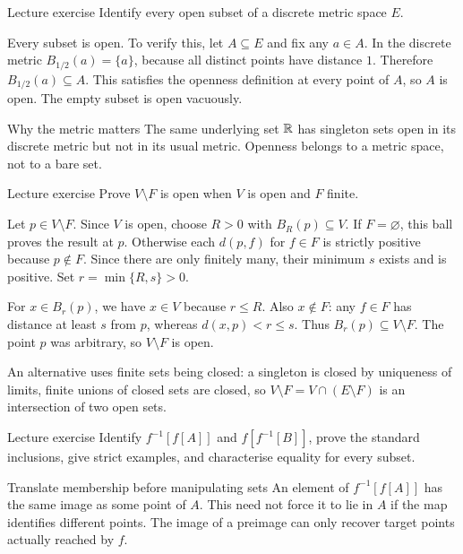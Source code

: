 \begin{exam}{Lecture exercise}
Identify every open subset of a discrete metric space $E$.
\end{exam}
\begin{answer}
Every subset is open. To verify this, let $A\subseteq E$ and fix any $a\in A$. In the discrete metric $B_{1/2}(a)=\{a\}$, because all distinct points have distance $1$. Therefore $B_{1/2}(a)\subseteq A$. This satisfies the openness definition at every point of $A$, so $A$ is open. The empty subset is open vacuously.
\end{answer}
\begin{note}{Why the metric matters}
The same underlying set $\mathbb R$ has singleton sets open in its discrete metric but not in its usual metric. Openness belongs to a metric space, not to a bare set.
\end{note}
\begin{exam}{Lecture exercise}
Prove $V\setminus F$ is open when $V$ is open and $F$ finite.
\end{exam}
\begin{answer}
Let $p\in V\setminus F$. Since $V$ is open, choose $R>0$ with $B_R(p)\subseteq V$. If $F=\varnothing$, this ball proves the result at $p$. Otherwise each $d(p,f)$ for $f\in F$ is strictly positive because $p\notin F$. Since there are only finitely many, their minimum $s$ exists and is positive. Set $r=\min\{R,s\}>0$.

For $x\in B_r(p)$, we have $x\in V$ because $r\le R$. Also $x\notin F$: any $f\in F$ has distance at least $s$ from $p$, whereas $d(x,p)<r\le s$. Thus $B_r(p)\subseteq V\setminus F$. The point $p$ was arbitrary, so $V\setminus F$ is open.

An alternative uses finite sets being closed: a singleton is closed by uniqueness of limits, finite unions of closed sets are closed, so $V\setminus F=V\cap(E\setminus F)$ is an intersection of two open sets.
\end{answer}
\begin{exam}{Lecture exercise}
Identify $f^{-1}[f[A]]$ and $f[f^{-1}[B]]$, prove the standard inclusions, give strict examples, and characterise equality for every subset.
\end{exam}
\begin{method}{Translate membership before manipulating sets}
An element of $f^{-1}[f[A]]$ has the same image as some point of $A$. This need not force it to lie in $A$ if the map identifies different points. The image of a preimage can only recover target points actually reached by $f$.
\end{method}

